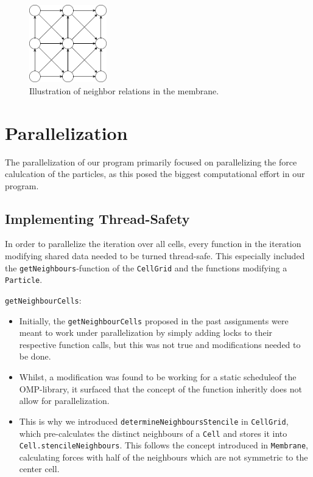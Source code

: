 \documentclass{article}
\begin{document}
\begin{figure}[H]
    \centering
    \includegraphics[width=0.3\textwidth]{../../res/membraneNeighbor.drawio}
    \caption{Illustration of neighbor relations in the membrane.}
    \label{fig:mem}
\end{figure}

\section{Parallelization}
\label{sec:para}

        The parallelization of our program primarily focused on parallelizing the force calulcation of the particles, as this posed the biggest computational effort in our program.
    \subsection{Implementing Thread-Safety}
In order to parallelize the iteration over all cells, every function in the iteration modifying shared data needed to be turned thread-safe. This especially included the \texttt{getNeighbours}-function of the \texttt{CellGrid} and the functions modifying a \texttt{Particle}.

\texttt{getNeighbourCells}:
\begin{itemize}
    \item{Initially, the \texttt{getNeighbourCells} proposed in the past assignments were meant to work under parallelization by simply adding locks to their respective function calls, but this was not true and modifications needed to be done.}
    \item{Whilst, a modification was found to be working for a static scheduleof the OMP-library, it surfaced that the concept of the function inheritly does not allow for parallelization.}
    \item{This is why we introduced \texttt{determineNeighboursStencile} in \texttt{CellGrid}, which pre-calculates the distinct neighbours of a \texttt{Cell} and stores it into \texttt{Cell.stencileNeighbours}. This follows the concept introduced in \texttt{Membrane}, calculating forces with half of the neighbours which are not symmetric to the center cell. }
\end{itemize}
\end{document}
